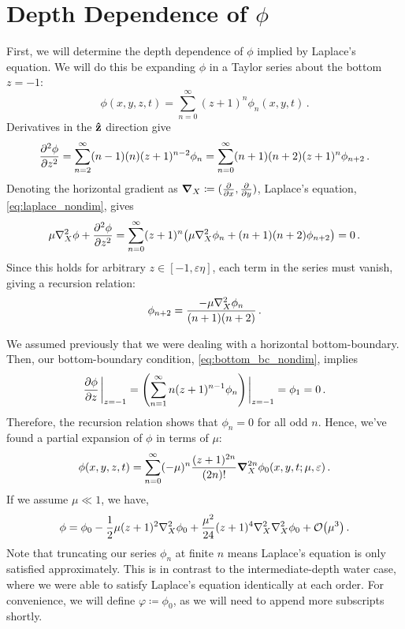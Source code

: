 \documentclass{jfm}
\let\Oldsection\section
\renewcommand{\section}{\FloatBarrier\Oldsection}
\renewcommand*{\epsilon}{\varepsilon}
\begin{document}
\section{Depth Dependence of \texorpdfstring{$\phi$}{Velocity Potential}}
First, we will determine the depth dependence of $\phi$ implied by
Laplace's equation.
We will do this be expanding $\phi$ in a Taylor series about the bottom
$z=-1$:
\begin{equation}
  \phi(x,y,z,t) = \sum_{n=0}^\infty (z+1)^n\phi_n(x,y,t) \,.
\end{equation}
Derivatives in the $\vu{z}$ direction give
\begin{equation}
  \pdv[2]{\phi}{z} = \sum_{n=2}^{\infty} (n-1)(n)(z+1)^{n-2}\phi_n =
  \sum_{n=0}^{\infty} (n+1)(n+2)(z+1)^n\phi_{n+2} \,.
\end{equation}
Denoting the horizontal gradient as $\grad_X \coloneqq
(\pdv{x},\pdv{y})$,
Laplace's equation, \cref{eq:laplace_nondim}, gives
\begin{equation}
  \mu \laplacian_X{\phi} + \pdv[2]{\phi}{z} = \sum_{n=0}^\infty
  (z+1)^n\pqty{\mu \laplacian_X \phi_n + (n+1)(n+2)\phi_{n+2}} = 0 \,.
\end{equation}
Since this holds for arbitrary $z \in [-1,\epsilon \eta]$, each
term in the series must vanish, giving a recursion relation:
\begin{equation}
  \phi_{n+2} = \frac{-\mu \laplacian_X{\phi_n}}{(n+1)(n+2)} \,.
\end{equation}

We assumed previously that we were dealing with a horizontal
bottom-boundary.
Then, our bottom-boundary condition, \cref{eq:bottom_bc_nondim}, implies
\begin{equation}
  \pdv{\phi}{z}\eval_{z=-1} = \pqty{\sum_{n=1}^\infty
  n(z+1)^{n-1}\phi_n}\eval_{z=-1} = \phi_1 = 0 \,.
\end{equation}
Therefore, the recursion relation shows that $\phi_n=0$ for all odd $n$.
Hence, we've found a partial expansion of $\phi$ in terms of $\mu$:
\begin{equation}
  \phi(x,y,z,t) = \sum_{n=0}^{\infty} (-\mu)^n \frac{(z+1)^{2n}}{(2n)!}
  \grad_{X}^{2n} \phi_0(x,y,t; \mu, \epsilon) \,.
  \label{eq:phi_expansion}
\end{equation}
If we assume $\mu \ll 1$, we have,
\begin{equation}
  \phi = \phi_0 - \frac{1}{2}\mu (z+1)^2\laplacian_X\phi_0 +
  \frac{\mu^2}{24}(z+1)^4\laplacian_X\laplacian_X\phi_0 +
  \order{\mu^3} \,.
\end{equation}
Note that truncating our series $\phi_n$ at finite $n$ means
Laplace's equation is only satisfied approximately.
This is in contrast to the intermediate-depth water case, where we were
able to satisfy Laplace's equation identically at each order.
For convenience, we will define $\varphi \coloneqq \phi_0$, as we will
need to append more subscripts shortly.
\end{document}
